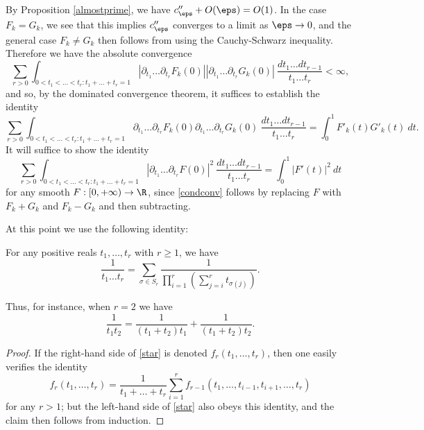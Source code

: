 By Proposition \ref{almostprime}, we have $c''_\eps+O(\eps)=O(1)$. In the case $F_k=G_k$, we see that this implies $c''_\eps$ converges to a limit as $\eps\rightarrow 0$, and the general case $F_k\ne G_k$ then follows from using the Cauchy-Schwarz inequality. Therefore we have the absolute convergence
\begin{equation}\label{absconv}
 \sum_{r>0} \int_{0 < t_1 < \dots < t_r: t_1 + \dots + t_r = 1} |\partial_{t_1} \dots \partial_{t_r} F_k(0)|
|\partial_{t_1} \dots \partial_{t_r} G_k(0)|\ \frac{dt_1 \dots dt_{r-1}}{t_1 \dots t_r} < \infty,
\end{equation}
and so, by the dominated convergence theorem, it suffices to establish the identity
\begin{equation}\label{condconv}
 \sum_{r>0} \int_{0 < t_1 < \dots < t_r: t_1 + \dots + t_r = 1} \partial_{t_1} \dots \partial_{t_r} F_k(0)
\partial_{t_1} \dots \partial_{t_r} G_k(0)\ \frac{dt_1 \dots dt_{r-1}}{t_1 \dots t_r} = \int_0^1 F'_k(t) G'_k(t)\ dt.
\end{equation}
It will suffice to show the identity
\begin{equation}\label{depol}
 \sum_{r>0} \int_{0 < t_1 < \dots < t_r: t_1 + \dots + t_r = 1} |\partial_{t_1} \dots \partial_{t_r} F(0)|^2\ \frac{dt_1 \dots dt_{r-1}}{t_1 \dots t_r} = \int_0^1 |F'(t)|^2\ dt
\end{equation}
for any smooth $F: [0,+\infty) \to \R$, since \eqref{condconv} follows by replacing $F$ with $F_k+G_k$ and $F_k-G_k$ and then subtracting.

At this point we use the following identity:

\begin{lemma}  For any positive reals $t_1,\dots,t_r$ with $r \geq 1$, we have
\begin{equation}\label{star}
 \frac{1}{t_1 \dots t_r} = \sum_{\sigma \in S_r} \frac{1}{\prod_{i=1}^r (\sum_{j=i}^r t_{\sigma(j)})}.
\end{equation}
\end{lemma}
Thus, for instance, when $r=2$ we have
$$ \frac{1}{t_1 t_2} = \frac{1}{(t_1+t_2) t_1} + \frac{1}{(t_1+t_2)t_2}.$$


\begin{proof}  If the right-hand side of \eqref{star} is denoted $f_r( t_1,\dots,t_r )$, then one easily verifies the identity
$$ f_r(t_1,\dots,t_r) = \frac{1}{t_1+\dots+t_r} \sum_{i=1}^r f_{r-1}(t_1,\dots,t_{i-1},t_{i+1},\dots,t_r)$$
for any $r > 1$; but the left-hand side of \eqref{star} also obeys this identity, and the claim then follows from induction.
\end{proof}

